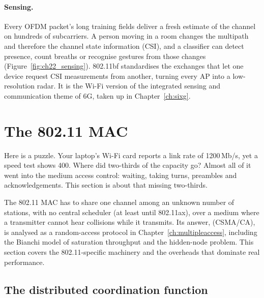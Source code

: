 \paragraph{Sensing.} Every OFDM packet's long training fields deliver a fresh estimate of the
channel on hundreds of subcarriers. A person moving in a room changes the multipath and therefore
the channel state information (CSI), and a classifier can detect presence, count breaths or
recognise gestures from those changes (Figure~\ref{fig:ch22_sensing}). 802.11bf standardises the
exchanges that let one device request CSI measurements from another, turning every AP into a
low-resolution radar. It is the Wi-Fi version of the integrated sensing and communication theme of
6G, taken up in Chapter~\ref{ch:sixg}.


\section{The 802.11 MAC}
\label{sec:ch22:mac}

Here is a puzzle. Your laptop's Wi-Fi card reports a link rate of 1200\,Mb/s, yet a speed test
shows 400. Where did two-thirds of the capacity go? Almost all of it went into the medium access
control: waiting, taking turns, preambles and acknowledgements. This section is about that missing
two-thirds.

The 802.11 MAC has to share one channel among an unknown number of stations, with no central
scheduler (at least until 802.11ax), over a medium where a transmitter cannot hear collisions while
it transmits. Its answer,  (CSMA/CA), is
analysed as a random-access protocol in Chapter~\ref{ch:multipleaccess}, including the Bianchi model
of saturation throughput and the hidden-node problem. This section covers the 802.11-specific
machinery and the overheads that dominate real performance.

\subsection{The distributed coordination function}

